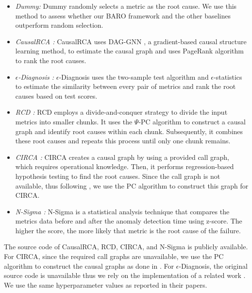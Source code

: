 \begin{itemize}
\item \textit{Dummy:} Dummy randomly selects a metric as the root cause. We use this method to assess whether our BARO framework and the other baselines outperform random selection.

\item \textit{CausalRCA \cite{Xin2023CausalRCA}:} CausalRCA uses DAG-GNN \cite{Yu2019DagGNN}, a gradient-based causal structure learning method, to estimate the causal graph and uses PageRank algorithm to rank the root causes.

\item \textit{$\epsilon$-Diagnosis \cite{Shan2019Ediagnosis}:}
 $\epsilon$-Diagnosis uses the two-sample test algorithm and $\epsilon$-statistics to estimate the similarity between every pair of metrics and rank the root causes based on test scores. 
 

\item \textit{RCD \cite{Azam2022rcd}:} RCD employs a divide-and-conquer strategy to divide the input metrics into smaller chunks. It uses the $\Psi$-PC algorithm \cite{Jaber2020PsiFCI} to construct a causal graph and identify root causes within each chunk. Subsequently, it combines these root causes and repeats this process until only one chunk remains.


\item \textit{CIRCA \cite{Li2022Circa}:} CIRCA creates a causal graph by using a provided call graph, which requires operational knowledge. Then, it performs regression-based hypothesis testing to find the root causes. Since the call graph is not available, thus following \cite{Azam2022rcd, liu2023pyrca}, we use the PC algorithm to construct this graph for CIRCA. 

\item \textit{N-Sigma \cite{Jinjin2018Microscope,Li2022Circa}:} N-Sigma is a statistical analysis technique that compares the metrics data before and after the anomaly detection time using z-score. The higher the score, the more likely that metric is the root cause of the failure. 

\end{itemize}

The source code of CausalRCA, RCD, CIRCA, and N-Sigma is publicly available. For CIRCA, since the required call graphs are unavailable, we use the PC algorithm to construct the causal graphs as done in \cite{Azam2022rcd, Ma2019Msrank, Ma2020Automap, Wang2018cloudranger, Xin2023CausalRCA}. For $\epsilon$-Diagnosis, the original source code is unavailable thus we rely on the implementation of a related work \cite{liu2023pyrca}. We use the same hyperparameter values as reported in their papers.




